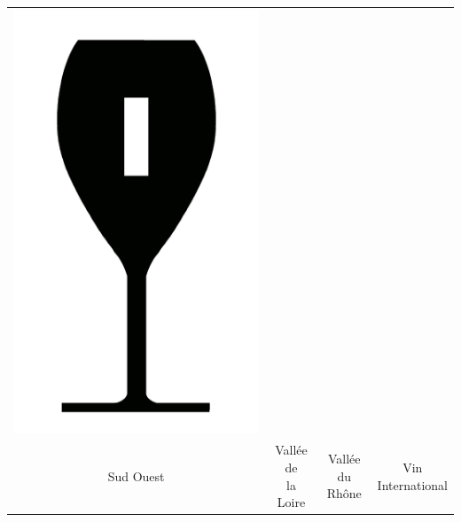 {\begin{center}
\begin{tabular}{ c c c c}
\includegraphics[scale=0.021, trim= 0em -5em -5em -5em,]{Icones/icon_international_black.pdf}
\\
	Sud Ouest  & \makecell{Vallée de\\la Loire}  & \makecell{Vallée du\\Rhône} & \makecell{Vin \\International} \\
\end{tabular}
\end{center}
}

